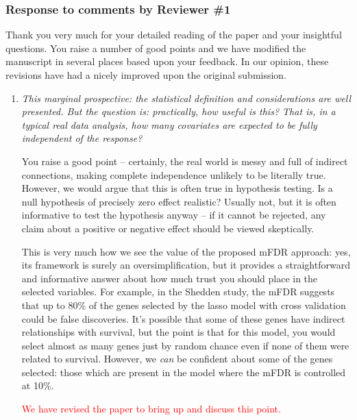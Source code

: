 \documentclass{article}
\providecommand{\note}[1]{\textcolor{red}{#1}}
\begin{document}
\subsubsection*{Response to comments by Reviewer \#1}

Thank you very much for your detailed reading of the paper and your insightful questions. You raise a number of good points and we have modified the manuscript in several places based upon your feedback.  In our opinion, these revisions have had a nicely improved upon the original submission.

\begin{enumerate}

\item {\em This marginal prospective: the statistical definition and considerations are well presented. But the question is: practically, how useful is this? That is, in a typical real data analysis, how many covariates are expected to be fully independent of the response?}

  You raise a good point -- certainly, the real world is messy and full of indirect connections, making complete independence unlikely to be literally true.  However, we would argue that this is often true in hypothesis testing.  Is a null hypothesis of precisely zero effect realistic?  Usually not, but it is often informative to test the hypothesis anyway -- if it cannot be rejected, any claim about a positive or negative effect should be viewed skeptically.

  This is very much how we see the value of the proposed mFDR approach: yes, its framework is surely an oversimplification, but it provides a straightforward and informative answer about how much trust you should place in the selected variables.  For example, in the Shedden study, the mFDR suggests that up to 80\% of the genes selected by the lasso model with cross validation could be false discoveries.  It's possible that some of these genes have indirect relationships with survival, but the point is that for this model, you would select almost as many genes just by random chance even if none of them were related to survival.  However, we {\em can} be confident about some of the genes selected: those which are present in the model where the mFDR is controlled at 10\%.
  
  \note{We have revised the paper to bring up and discuss this point.}



\end{enumerate}
\end{document}
